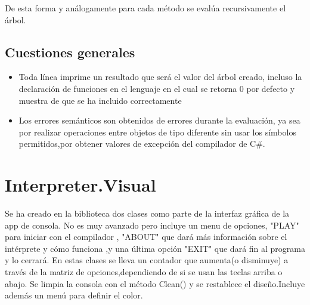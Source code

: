\documentclass[a4paper,12pt]{article}
\begin{document}
De esta forma y an\'alogamente para cada m\'etodo se eval\'ua recursivamente el \'arbol.

\subsection*{Cuestiones generales}

\begin{itemize}
    \item Toda l\'inea imprime un resultado que ser\'a el valor del \'arbol creado, incluso la declaraci\'on de funciones en el lenguaje en el cual se retorna 0 por defecto y muestra de que se ha incluido correctamente
    \item Los errores sem\'anticos son obtenidos de errores durante la evaluaci\'on, ya sea por realizar operaciones entre objetos de tipo diferente sin usar los s\'imbolos permitidos,por obtener valores de excepci\'on del compilador de C\#.
\end{itemize}

\section{Interpreter.Visual}\label{sec:intro}
Se ha creado en la biblioteca dos clases como parte de la interfaz gr\'afica de la app de consola. No es muy avanzado pero incluye un menu de opciones, "PLAY" para iniciar con el compilador , "ABOUT" que dar\'a m\'as informaci\'on sobre el int\'erprete y c\'omo funciona ,y una \'ultima opci\'on "EXIT" que dar\'a fin al programa y lo cerrar\'a. 
En estas clases se lleva un contador que aumenta(o disminuye) a trav\'es de la matriz de opciones,dependiendo de si se usan las teclas arriba o abajo. Se limpia la consola con el m\'etodo Clean() y se restablece el diseño.Incluye adem\'as un men\'u para definir el color.  
 
\end{document}
